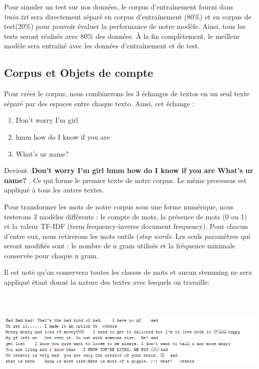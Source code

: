 \documentclass[12pt,french]{article}
\begin{document}
Pour simuler un test sur nos données, le corpus d'entraînement fourni dans \emph{train.txt} sera directement séparé en corpus d'entraînement (80\%) et en corpus de test(20\%)  pour pouvoir évaluer la performance de notre modèle. Ainsi, tous les tests seront réalisés avec 80\% des données. À la fin complètement, le meilleur modèle sera entraîné avec les données d'entraînement et de test.


\subsection*{Corpus et Objets de compte}
Pour créer le corpus, nous combinerons les 3 échanges de textos en un seul texte séparé par des espaces entre chaque texto. Ainsi, cet échange :
\begin{enumerate}
\item Don't worry  I'm girl
\item hmm how do I know if you are
\item What's ur name?
\end{enumerate}
Devient :\textbf{Don't worry  I'm girl hmm how do I know if you are  What's ur name?} . Ce qui forme le premier texte de notre corpus. Le même processus est appliqué à tous les autres textes.

Pour transformer les mots de notre corpus sous une forme numérique, nous testerons 3 modèles différents : le compte de mots, la présence de mots (0 ou 1) et la valeur TF-IDF (term frequency-inverse document frequency). Pour chacun d'entre eux, nous retirerons les mots outils (\emph{stop words}. Les seuls paramètres qui seront modifiés sont : le nombre de n gram utilisés et la fréquence minimale conservée pour chaque n gram.

Il est noté qu'on conservera toutes les classes de mots et aucun stemming ne sera appliqué étant donné la nature des textes avec lesquels on travaille:


\includegraphics[width=\linewidth,height=5cm]{exemples_text}
\end{document}
